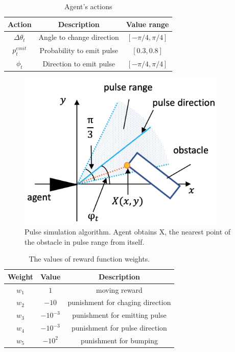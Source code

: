\documentclass[../main]{subfiles}
\begin{document}
\newpage
{}
\begin{table}[H]
  \caption{Agent's actions}\label{tab:agent_actions}
  \centering
    \begin{tabular}{c|c|c}
      Action & Description & Value range \\ \hline
      $\Delta\theta_t$ & Angle to change direction & $[-\pi/4, \pi/4]$ \\
      $p^{emit}_t$ & Probability to emit pulse & $[0.3, 0.8]$ \\
      $\phi_t$ & Direction to emit pulse & $[-\pi/4, \pi/4]$ \\
    \end{tabular}
\end{table}


\newpage
{}
\begin{figure}[H]
  \centering
  \vfill
  \includegraphics[width=10cm]{figures/pulse_simulation.png}
  \caption{
    Pulse simulation algorithm. Agent obtains X,
    the nearest point of the obstacle in pulse range from itself.
  }\label{fig:pulse_simulation}
\end{figure}


\newpage
{}
\begin{table}[H]
  \caption{The values of reward function weights.}
  \label{tab:reward_weights}
  \centering
    \begin{tabular}{c|c|c}
      Weight & Value      & Description \\ \hline
      $w_1$  & $1$        & moving reward\\
      $w_2$  & $-10$      & punishment for chaging direction\\
      $w_3$  & $-10^{-3}$ & punishment for emitting pulse \\
      $w_4$  & $-10^{-3}$ & punishment for pulse direction\\
      $w_5$  & $-10^2$    & punishment for bumping\\
    \end{tabular}
\end{table}
\end{document}
